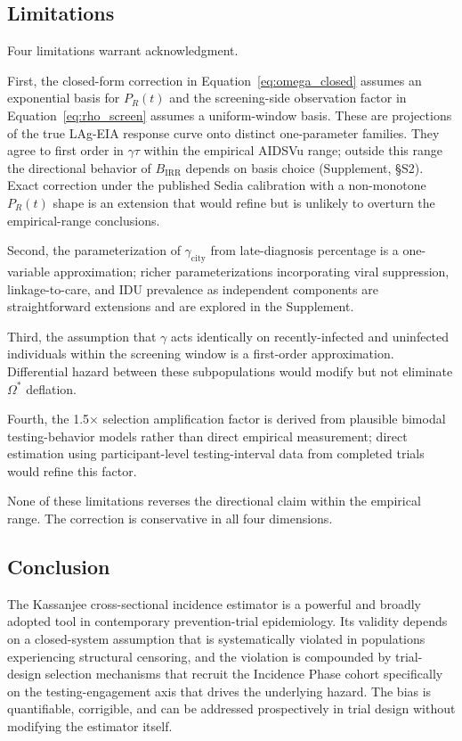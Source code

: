 \documentclass[11pt]{article}
\begin{document}
\subsection{Limitations}

Four limitations warrant acknowledgment.

First, the closed-form correction in Equation~\ref{eq:omega_closed} assumes an exponential basis for $P_R(t)$ and the screening-side observation factor in Equation~\ref{eq:rho_screen} assumes a uniform-window basis. These are projections of the true LAg-EIA response curve onto distinct one-parameter families. They agree to first order in $\gamma\tau$ within the empirical AIDSVu range; outside this range the directional behavior of $B_{\mathrm{IRR}}$ depends on basis choice (Supplement, §S2). Exact correction under the published Sedia calibration with a non-monotone $P_R(t)$ shape is an extension that would refine but is unlikely to overturn the empirical-range conclusions.

Second, the parameterization of $\gamma_{\mathrm{city}}$ from late-diagnosis percentage is a one-variable approximation; richer parameterizations incorporating viral suppression, linkage-to-care, and IDU prevalence as independent components are straightforward extensions and are explored in the Supplement.

Third, the assumption that $\gamma$ acts identically on recently-infected and uninfected individuals within the screening window is a first-order approximation. Differential hazard between these subpopulations would modify but not eliminate $\Omega^*$ deflation.

Fourth, the 1.5$\times$ selection amplification factor is derived from plausible bimodal testing-behavior models rather than direct empirical measurement; direct estimation using participant-level testing-interval data from completed trials would refine this factor.

None of these limitations reverses the directional claim within the empirical range. The correction is conservative in all four dimensions.

\subsection{Conclusion}

The Kassanjee cross-sectional incidence estimator is a powerful and broadly adopted tool in contemporary prevention-trial epidemiology. Its validity depends on a closed-system assumption that is systematically violated in populations experiencing structural censoring, and the violation is compounded by trial-design selection mechanisms that recruit the Incidence Phase cohort specifically on the testing-engagement axis that drives the underlying hazard. The bias is quantifiable, corrigible, and can be addressed prospectively in trial design without modifying the estimator itself.
\end{document}
